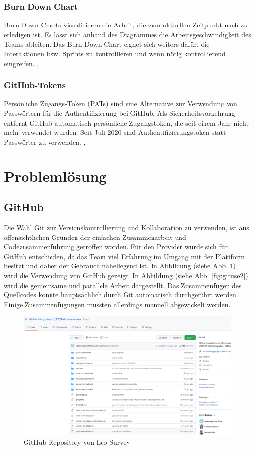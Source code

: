 \subsubsection{Burn Down Chart}
Burn Down Charts visualisieren die Arbeit, die zum aktuellen Zeitpunkt noch zu erledigen ist. 
Es lässt sich anhand des Diagrammes die Arbeitsgeschwindigkeit des Teams ableiten.
Das Burn Down Chart eignet sich weiters dafür, die Interaktionen bzw. Sprints zu kontrollieren und 
wenn nötig kontrollierend eingreifen. \cite{noauthor_burn-down-chart_2021}, \cite{noauthor_was_nodate-4}

\subsubsection{GitHub-Tokens}
Persönliche Zugangs-Token (PATs) sind eine Alternative zur Verwendung von Passwörtern für die 
Authentifizierung bei GitHub. Als Sicherheitsvorkehrung entfernt GitHub automatisch persönliche 
Zugangstoken, die seit einem Jahr nicht mehr verwendet wurden. Seit Juli 2020 sind 
Authentifizierungstoken statt Passwörter zu verwenden. \cite{noauthor_token_2020}, \cite{noauthor_creating_nodate}

\section{Problemlösung}
\subsection{GitHub}
Die Wahl Git zur Versionskontrollierung und Kollaboration zu verwenden, ist aus offensichtlichen Gründen der einfachen 
Zusammenarbeit und Codezusammenführung getroffen worden. Für den Provider wurde sich für GitHub entschieden, da das Team 
viel Erfahrung im Umgang mit der Plattform besitzt und daher der Gebrauch naheliegend ist. In Abbildung (siehe Abb. \ref{fig:gituse}) wird die Verwendung 
von GitHub gezeigt. In Abbildung (siehe Abb. \ref{fig:gituse2}) wird die gemeinsame und parallele Arbeit dargestellt. 
Das Zusammenfügen des Quellcodes konnte hauptsächlich durch Git automatisch durchgeführt werden. Einige Zusammenfügungen mussten allerdings 
manuell abgewickelt werden. 

\begin{figure}[H]
    \includegraphics[width=1.0\textwidth]{pics/GitHub.PNG}
    \centering
    \caption{GitHub Repository von Leo-Survey}
    \label{fig:gituse}
\end{figure}

